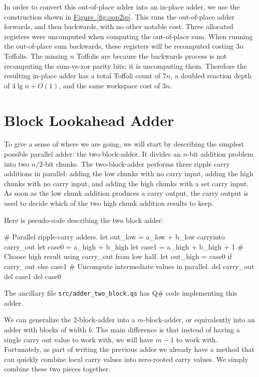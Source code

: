 \documentclass[onecolumn,unpublished]{quantumarticle}
\theoremstyle{definition}
\theoremstyle{definition}
\theoremstyle{definition}
\newcommand{\fig}[1]{\hyperref[fig:#1]{Figure~\ref*{fig:#1}}}
\begin{document}
In order to convert this out-of-place adder into an in-place adder, we use the construction shown in \fig{oop2ip}.
This runs the out-of-place adder forwards, and then backwards, with no other notable cost.
Three allocated registers were uncomputed when computing the out-of-place sum.
When running the out-of-place sum backwards, these registers will be recomputed costing $3n$ Toffolis.
The missing $n$ Toffolis are because the backwards process is not recomputing the sum-vs-xor parity bits; it is uncomputing them.
Therefore the resulting in-place adder has a total Toffoli count of $7n$, a doubled reaction depth of $4 \lg n + O(1)$, and the same workspace cost of $3n$.

\section{Block Lookahead Adder}

To give a sense of where we are going, we will start by describing the simplest possible parallel adder: the two-block-adder.
It divides an $n$-bit addition problem into two $n/2$-bit chunks.
The two-block-adder performs three ripple carry additions in parallel: adding the low chunks with no carry input, adding the high chunks with no carry input, and adding the high chunks with a set carry input.
As soon as the low chunk addition produces a carry output, the carry output is used to decide which of the two high chunk addition results to keep.

Here is pseudo-code describing the two block adder:

\begin{python}
    # Parallel ripple-carry adders.
    let out_low = a_low + b_low carryinto carry_out
    let case0 = a_high + b_high
    let case1 = a_high + b_high + 1
    # Choose high result using carry_out from low half.
    let out_high = case0 if carry_out else case1
    # Uncompute intermediate values in parallel.
    del carry_out
    del case1
    del case0
\end{python}

The ancillary file \texttt{src/adder\_two\_block.qs} has Q\# code implementing this adder.

We can generalize the 2-block-adder into a $m$-block-adder, or equivalently into an adder with blocks of width $b$.
The main difference is that instead of having a single carry out value to work with, we will have $m-1$ to work with.
Fortunately, as part of writing the previous adder we already have a method that can quickly combine local carry values into zero-rooted carry values.
We simply combine these two pieces together.
\end{document}
